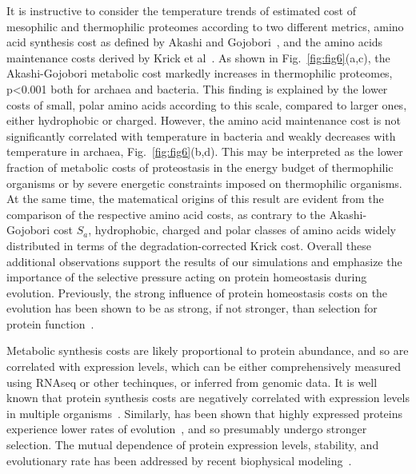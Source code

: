 \documentclass[10pt,letterpaper]{article}
\begin{document}
It is instructive to consider the temperature trends of estimated cost of mesophilic and thermophilic proteomes according to two different metrics, amino acid synthesis cost as defined by Akashi and Gojobori~\cite{Akashi2002Metabolic}, and the amino acids maintenance costs derived by Krick et al~\cite{Krick2014Amino}. As shown in Fig.~\ref{fig:fig6}(a,c), the Akashi-Gojobori metabolic cost markedly increases in thermophilic proteomes, p\textless 0.001 both for archaea and bacteria. This finding is explained by the lower costs of small, polar amino acids according to this scale, compared to larger ones, either hydrophobic or charged. However, the amino acid maintenance cost is not significantly correlated with temperature in bacteria and weakly decreases with temperature in archaea, Fig.~\ref{fig:fig6}(b,d).  This may be interpreted as the lower fraction of metabolic costs  of proteostasis in the energy budget of thermophilic organisms or by severe energetic constraints imposed on thermophilic organisms. At the same time, the matematical origins of this result are evident from the comparison of the respective amino acid costs, as contrary to the Akashi-Gojobori cost $S_{a}$, hydrophobic, charged and polar classes of amino acids widely distributed in terms of the degradation-corrected Krick cost. Overall these additional observations support the results of our simulations and emphasize the importance of the selective pressure acting on protein homeostasis during evolution. Previously, the strong influence of protein homeostasis costs on the evolution has been shown to be as strong, if not stronger, than selection for protein function~\cite{Assis2014Conserved}.

Metabolic synthesis costs are likely proportional to protein abundance, and so are correlated with expression levels, which can be either comprehensively measured using RNAseq or other techinques, or inferred from genomic data. It is well known that protein synthesis costs are negatively correlated with expression levels in multiple organisms~\cite{Akashi2002Metabolic,Seligmann2003CostMinimization,Heizer2006Amino,Raiford2008Do}. Similarly, has been shown that highly expressed proteins experience lower rates of evolution~\cite{Pal2001Highly,Rocha2004An,Drummond2005Why}, and so presumably undergo stronger selection. The mutual dependence of protein expression levels, stability, and evolutionary rate has been addressed by recent biophysical modeling~\cite{Serohijos2012Protein}.
\end{document}
